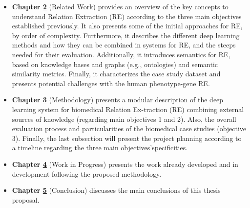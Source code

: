 \begin{itemize}
   \item \textbf{Chapter \hyperlink{2}{2}} (Related Work) provides an overview of the key concepts to understand Relation Extraction (RE) according to the three main objectives established previously. It also presents some of the initial approaches for RE, by order of complexity. Furthermore, it describes the different deep learning methods and how they can be combined in systems for RE, and the steeps needed for their evaluation. Additionally, it introduces semantics for RE, based on knowledge bases and graphs (e.g., ontologies) and semantic similarity metrics. Finally, it characterizes the case study dataset and presents potential challenges with the human phenotype-gene RE.
   \item \textbf{Chapter \hyperlink{3}{3}} (Methodology) presents a modular description of the deep learning system for biomedical Relation Ex-traction (RE) combining external sources of knowledge (regarding main objectives 1 and 2). Also, the overall evaluation process and particularities of the biomedical case studies (objective 3). Finally, the last subsection will present the project planning according to a timeline regarding the three main objectives’specificities. 
   \item \textbf{Chapter \hyperlink{4}{4}} (Work in Progress) presents the work already developed and in development following the proposed methodology.
   \item \textbf{Chapter \hyperlink{5}{5}} (Conclusion) discusses the main conclusions of this thesis proposal.
\end{itemize}